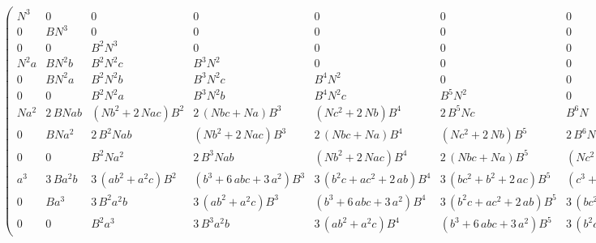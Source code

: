 \documentclass{standalone}
\begin{document}
$\left(\begin{array}{rrrrrrrrrrrr}
N^3&0&0&0&0&0&0&0&0&0&0&0\\
0&BN^3&0&0&0&0&0&0&0&0&0&0\\
0&0&B^2N^3&0&0&0&0&0&0&0&0&0\\
N^2a&BN^2b&B^2N^2c&B^3N^2&0&0&0&0&0&0&0&0\\
0&BN^2a&B^2N^2b&B^3N^2c&B^4N^2&0&0&0&0&0&0&0\\
0&0&B^2N^2a&B^3N^2b&B^4N^2c&B^5N^2&0&0&0&0&0&0\\
Na^2&2\,BNab&{\left(Nb^2+2\,Nac\right)}B^2&2\,{\left(Nbc+Na\right)}B^3&{\left(Nc^2+2\,Nb\right)}B^4&2\,B^5Nc&B^6N&0&0&0&0&0\\
0&BNa^2&2\,B^2Nab&{\left(Nb^2+2\,Nac\right)}B^3&2\,{\left(Nbc+Na\right)}B^4&{\left(Nc^2+2\,Nb\right)}B^5&2\,B^6Nc&B^7N&0&0&0&0\\
0&0&B^2Na^2&2\,B^3Nab&{\left(Nb^2+2\,Nac\right)}B^4&2\,{\left(Nbc+Na\right)}B^5&{\left(Nc^2+2\,Nb\right)}B^6&2\,B^7Nc&B^8N&0&0&0\\
a^3&3\,Ba^2b&3\,{\left(ab^2+a^2c\right)}B^2&{\left(b^3+6\,abc+3\,a^2\right)}B^3&3\,{\left(b^2c+ac^2+2\,ab\right)}B^4&3\,{\left(bc^2+b^2+2\,ac\right)}B^5&{\left(c^3+6\,bc+3\,a\right)}B^6&3\,{\left(c^2+b\right)}B^7&3\,B^8c&B^9&0&0\\
0&Ba^3&3\,B^2a^2b&3\,{\left(ab^2+a^2c\right)}B^3&{\left(b^3+6\,abc+3\,a^2\right)}B^4&3\,{\left(b^2c+ac^2+2\,ab\right)}B^5&3\,{\left(bc^2+b^2+2\,ac\right)}B^6&{\left(c^3+6\,bc+3\,a\right)}B^7&3\,{\left(c^2+b\right)}B^8&3\,B^9c&B^{10}&0\\
0&0&B^2a^3&3\,B^3a^2b&3\,{\left(ab^2+a^2c\right)}B^4&{\left(b^3+6\,abc+3\,a^2\right)}B^5&3\,{\left(b^2c+ac^2+2\,ab\right)}B^6&3\,{\left(bc^2+b^2+2\,ac\right)}B^7&{\left(c^3+6\,bc+3\,a\right)}B^8&3\,{\left(c^2+b\right)}B^9&3\,B^{10}c&B^{11}
\end{array}\right)$
\end{document}
